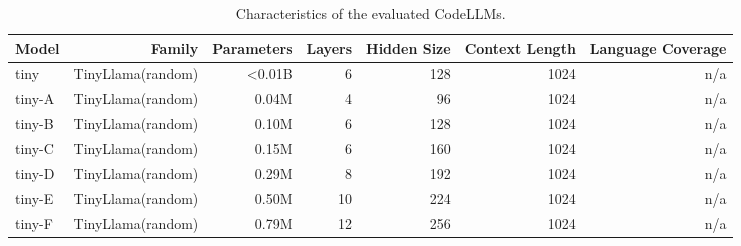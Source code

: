 \begin{table}[t]
\centering
\caption{Characteristics of the evaluated CodeLLMs.}
\label{tab:models}
\begin{tabular}{lrrrrrr}
\toprule
Model & Family & Parameters & Layers & Hidden Size & Context Length & Language Coverage \\
\midrule
tiny & TinyLlama(random) & \textless{}0.01B & 6 & 128 & 1024 & n/a \\
tiny-A & TinyLlama(random) & 0.04M & 4 & 96 & 1024 & n/a \\
tiny-B & TinyLlama(random) & 0.10M & 6 & 128 & 1024 & n/a \\
tiny-C & TinyLlama(random) & 0.15M & 6 & 160 & 1024 & n/a \\
tiny-D & TinyLlama(random) & 0.29M & 8 & 192 & 1024 & n/a \\
tiny-E & TinyLlama(random) & 0.50M & 10 & 224 & 1024 & n/a \\
tiny-F & TinyLlama(random) & 0.79M & 12 & 256 & 1024 & n/a \\
\bottomrule
\end{tabular}
\end{table}
